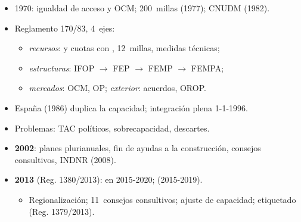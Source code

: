 \documentclass{article}
\begin{document}
\begin{columnas}
\begin{itemize}
\item 1970: igualdad de acceso y OCM; 200~millas (1977); CNUDM (1982).
\item Reglamento 170/83, 4~ejes:
  \begin{itemize}
  \item \emph{recursos}:  y cuotas con , 12~millas, medidas técnicas;
  \item \emph{estructuras}: IFOP $\to$ FEP $\to$ FEMP $\to$ FEMPA;
  \item \emph{mercados}: OCM, OP; \emph{exterior}: acuerdos, OROP.
  \end{itemize}
\item España (1986) duplica la capacidad; integración plena 1-1-1996.
\item Problemas: TAC políticos, sobrecapacidad, descartes.
\end{itemize}

\begin{itemize}
\item \textbf{2002}: planes plurianuales, fin de ayudas a la construcción, consejos consultivos, INDNR (2008).
\item \textbf{2013} (Reg. 1380/2013):  en 2015-2020;  (2015-2019).
  \begin{itemize}
  \item Regionalización; 11~consejos consultivos; ajuste de capacidad; etiquetado (Reg. 1379/2013).
  \end{itemize}
\end{itemize}


\end{columnas}
\end{document}
